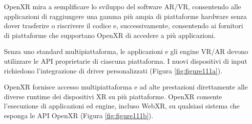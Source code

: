 OpenXR mira a semplificare lo sviluppo del software AR/VR, consentendo alle applicazioni di raggiungere una gamma più ampia di piattaforme hardware senza dover trasferire o riscrivere il codice e, successivamente, consentendo ai fornitori di piattaforme che supportano OpenXR di accedere a più applicazioni.

Senza uno standard multipiattaforma, le applicazioni e gli engine VR/AR devono utilizzare le API proprietarie di ciascuna piattaforma. I nuovi dispositivi di input richiedono l'integrazione di driver personalizzati (Figura \ref{fig:figure111a}).

OpenXR fornisce accesso multipiattaforma e ad alte prestazioni direttamente alle diverse runtime dei dispositivi XR su più piattaforme. OpenXR consente l'esecuzione di applicazioni ed engine, incluso WebXR, su qualsiasi sistema che esponga le API OpenXR (Figura \ref{fig:figure111b}).

